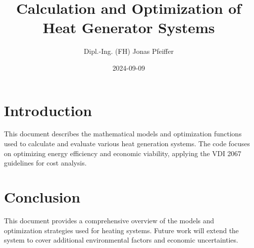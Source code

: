 \documentclass{article}
\title{Calculation and Optimization of Heat Generator Systems}
\author{Dipl.-Ing. (FH) Jonas Pfeiffer}
\date{2024-09-09}
\begin{document}
\maketitle

\section{Introduction}
This document describes the mathematical models and optimization functions used to calculate and evaluate various heat generation systems. The code focuses on optimizing energy efficiency and economic viability, applying the VDI 2067 guidelines for cost analysis.









\section{Conclusion}
This document provides a comprehensive overview of the models and optimization strategies used for heating systems. Future work will extend the system to cover additional environmental factors and economic uncertainties.
\end{document}
